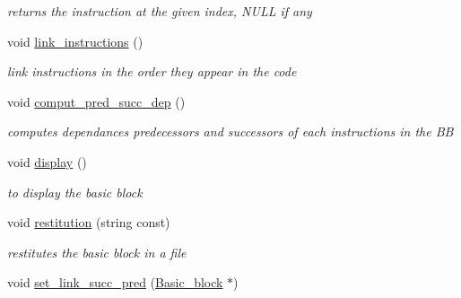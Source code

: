 \begin{DoxyCompactItemize}
\begin{DoxyCompactList}\small\item\em returns the instruction at the given index, N\-U\-L\-L if any \end{DoxyCompactList}\item 
\hypertarget{class_basic__block_ae53d18eb1436d162ee9ae565c46b35e5}{void \hyperlink{class_basic__block_ae53d18eb1436d162ee9ae565c46b35e5}{link\-\_\-instructions} ()}\label{class_basic__block_ae53d18eb1436d162ee9ae565c46b35e5}

\begin{DoxyCompactList}\small\item\em link instructions in the order they appear in the code \end{DoxyCompactList}\item 
\hypertarget{class_basic__block_a2f2cdedde41f78b7982e6d6d348524c2}{void \hyperlink{class_basic__block_a2f2cdedde41f78b7982e6d6d348524c2}{comput\-\_\-pred\-\_\-succ\-\_\-dep} ()}\label{class_basic__block_a2f2cdedde41f78b7982e6d6d348524c2}

\begin{DoxyCompactList}\small\item\em computes dependances predecessors and successors of each instructions in the B\-B \end{DoxyCompactList}\item 
\hypertarget{class_basic__block_aad79779b098ba4ccd1549a8dbbd80d7d}{void \hyperlink{class_basic__block_aad79779b098ba4ccd1549a8dbbd80d7d}{display} ()}\label{class_basic__block_aad79779b098ba4ccd1549a8dbbd80d7d}

\begin{DoxyCompactList}\small\item\em to display the basic block \end{DoxyCompactList}\item 
\hypertarget{class_basic__block_af74c4eeeecfb7a3f3fddbeb2994523a4}{void \hyperlink{class_basic__block_af74c4eeeecfb7a3f3fddbeb2994523a4}{restitution} (string const)}\label{class_basic__block_af74c4eeeecfb7a3f3fddbeb2994523a4}

\begin{DoxyCompactList}\small\item\em restitutes the basic block in a file \end{DoxyCompactList}\item 
\hypertarget{class_basic__block_acb9b80088751bcf4329b3d1532f724ac}{void \hyperlink{class_basic__block_acb9b80088751bcf4329b3d1532f724ac}{set\-\_\-link\-\_\-succ\-\_\-pred} (\hyperlink{class_basic__block}{Basic\-\_\-block} $\ast$)}\label{class_basic__block_acb9b80088751bcf4329b3d1532f724ac}


\end{DoxyCompactItemize}
